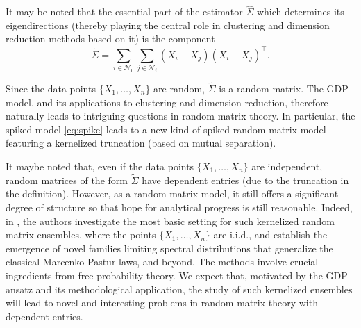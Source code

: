 It may be noted that the essential part of the estimator $\hat \Sigma$ which determines its eigendirections (thereby playing the central role in clustering and dimension reduction methods based on it) is the component 
\[ \tilde \Sigma = \sum_{i \in \mathcal{N}_0} \sum_{j \in \mathcal{N}_i} (X_i-X_j)(X_i-X_j)^\top .\]

Since the data points $\{X_1,\ldots,X_n\}$ are random, $\tilde \Sigma$ is a random matrix. The GDP model, and its applications to clustering and dimension reduction, therefore naturally leads to intriguing questions in random matrix theory. In particular, the spiked model \eqref{eq:spike} leads to a new kind of spiked random matrix model featuring a kernelized truncation (based on mutual separation).

It maybe noted that, even if the data points $\{X_1,\ldots,X_n\}$ are independent, random matrices of the form $\tilde \Sigma$ have dependent entries (due to the truncation in the definition). However, as a random matrix model, it still offers a significant degree of structure so that hope for analytical progress is still reasonable. Indeed, in \cite{ghosh-mukherjee-talukdar}, the authors investigate the most basic setting for such kernelized random matrix ensembles, where the points $\{X_1,\ldots,X_n\}$ are i.i.d., and establish the emergence of novel families limiting spectral distributions that generalize the classical Marcenko-Pastur laws, and beyond. The methods involve crucial ingredients from free probability theory. We expect that, motivated by the GDP ansatz and its methodological application, the study of such kernelized ensembles will lead to novel and interesting problems in random matrix theory with dependent entries.


